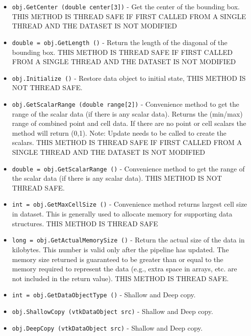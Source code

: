 \begin{itemize}
\item  \verb|obj.GetCenter (double center[3])| -  Get the center of the bounding box.
 THIS METHOD IS THREAD SAFE IF FIRST CALLED FROM A SINGLE THREAD AND
 THE DATASET IS NOT MODIFIED

\item  \verb|double = obj.GetLength ()| -  Return the length of the diagonal of the bounding box.
 THIS METHOD IS THREAD SAFE IF FIRST CALLED FROM A SINGLE THREAD AND
 THE DATASET IS NOT MODIFIED

\item  \verb|obj.Initialize ()| -  Restore data object to initial state,
 THIS METHOD IS NOT THREAD SAFE.

\item  \verb|obj.GetScalarRange (double range[2])| -  Convenience method to get the range of the scalar data (if there is any 
 scalar data). Returns the (min/max) range of combined point and cell data.
 If there are no point or cell scalars the method will return (0,1).
 Note: Update needs to be called to create the scalars.
 THIS METHOD IS THREAD SAFE IF FIRST CALLED FROM A SINGLE THREAD AND
 THE DATASET IS NOT MODIFIED

\item  \verb|double = obj.GetScalarRange ()| -  Convenience method to get the range of the scalar data (if there is any 
 scalar data). 
 THIS METHOD IS NOT THREAD SAFE.

\item  \verb|int = obj.GetMaxCellSize ()| -  Convenience method returns largest cell size in dataset. This is generally
 used to allocate memory for supporting data structures.
 THIS METHOD IS THREAD SAFE

\item  \verb|long = obj.GetActualMemorySize ()| -  Return the actual size of the data in kilobytes. This number
 is valid only after the pipeline has updated. The memory size
 returned is guaranteed to be greater than or equal to the
 memory required to represent the data (e.g., extra space in
 arrays, etc. are not included in the return value). THIS METHOD
 IS THREAD SAFE.

\item  \verb|int = obj.GetDataObjectType ()| -  Shallow and Deep copy.

\item  \verb|obj.ShallowCopy (vtkDataObject src)| -  Shallow and Deep copy.

\item  \verb|obj.DeepCopy (vtkDataObject src)| -  Shallow and Deep copy.


\end{itemize}
